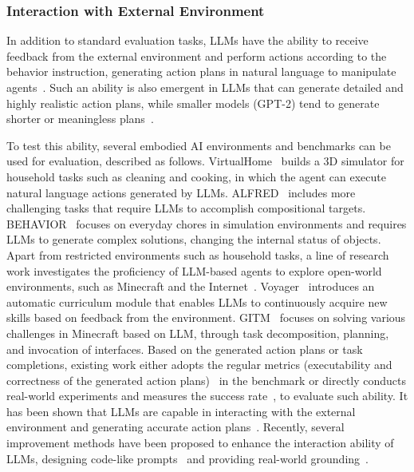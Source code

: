 \subsubsection{Interaction with External Environment}
In addition to standard evaluation tasks, LLMs have the ability to receive feedback from the external environment and perform actions  according to the behavior instruction, \eg generating action plans in natural language to manipulate agents~\cite{Huang-ICML-2022-Language,Carta-arxiv-2023-Grounding}.
Such an ability is also emergent in LLMs  that can generate detailed and highly realistic action plans, while smaller models (\eg GPT-2) tend to generate shorter or meaningless plans~\cite{Huang-ICML-2022-Language}. 

To test this ability,  several embodied AI environments and benchmarks can be  used for evaluation, described as follows. VirtualHome~\cite{Puig-CVPR-2018-VirtualHome} builds a 3D simulator for household tasks such as cleaning and cooking, in which the agent can execute natural language actions generated by LLMs. ALFRED~\cite{Shridhar-CVPR-2020-ALFRED} includes more challenging tasks that require LLMs to accomplish compositional targets. BEHAVIOR~\cite{Srivastava-CoRL-2021-BEHAVIOR} focuses on  {everyday chores} in simulation environments and requires LLMs to generate complex solutions, \eg changing the internal status of objects. 
{
Apart from restricted environments such as household tasks, a line of research work investigates the proficiency of LLM-based agents to explore open-world environments, such as Minecraft and the Internet~\cite{Zhu-arxiv-2023-Ghost, Wang-arxiv-2023-Voyager}.
Voyager~\cite{Wang-arxiv-2023-Voyager} introduces an automatic curriculum module that enables LLMs to continuously acquire new skills based on feedback from the environment.  
GITM~\cite{Zhu-arxiv-2023-Ghost} focuses on solving  various challenges in Minecraft based on LLM,  through task decomposition, planning, and invocation of interfaces. 
}
Based on the generated action plans or task completions, existing work either adopts the regular metrics (\eg executability and correctness of the generated action plans)~\cite{Huang-ICML-2022-Language} in the benchmark or directly conducts real-world experiments and measures the success rate~\cite{Ahn-arxiv-2022-Do}, to evaluate such ability.
It has been shown that  LLMs are  capable in interacting with the external environment and generating accurate action plans~\cite{Liang-arxiv-2022-Code}.
Recently, several improvement methods have  been proposed to enhance the interaction ability of LLMs, \eg designing code-like prompts~\cite{Singh-arxiv-2022-ProgPrompt} and providing real-world grounding~\cite{Ahn-arxiv-2022-Do}.  

